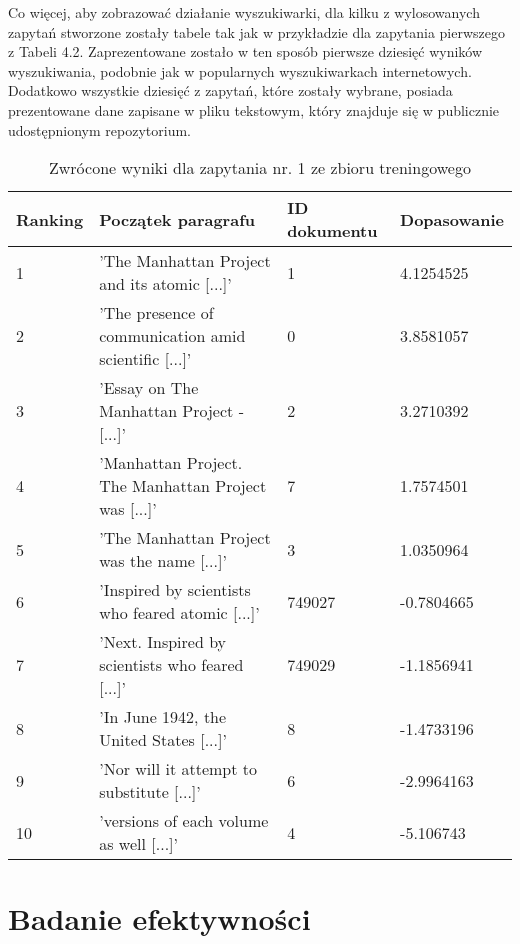 Co więcej, aby zobrazować działanie wyszukiwarki, dla kilku z wylosowanych zapytań stworzone zostały tabele tak jak w przykładzie dla zapytania pierwszego z Tabeli 4.2. Zaprezentowane zostało w ten sposób pierwsze dziesięć wyników wyszukiwania, podobnie jak w popularnych wyszukiwarkach internetowych. Dodatkowo wszystkie dziesięć z zapytań, które zostały wybrane, posiada prezentowane dane zapisane w pliku tekstowym, który znajduje się w publicznie udostępnionym repozytorium. 

\begin{table}[htp]
\centering
\caption{Zwrócone wyniki dla zapytania nr. 1 ze zbioru treningowego\protect\footnotemark[1]}
\vspace*{5mm}
\begin{tabular}{llll}
   Ranking & Początek paragrafu & ID dokumentu & Dopasowanie \\
   \hline
    1 & 'The Manhattan Project and its atomic [...]' & 1 & 4.1254525 \\
    2 & 'The presence of communication amid scientific [...]' & 0 &  3.8581057\\
    3 & 'Essay on The Manhattan Project - [...]' & 2 & 3.2710392 \\
    4 & 'Manhattan Project. The Manhattan Project was [...]' & 7 & 1.7574501 \\
    5 & 'The Manhattan Project was the name [...]' & 3 & 1.0350964 \\
    6 & 'Inspired by scientists who feared atomic [...]' & 749027 &  -0.7804665 \\
    7 & 'Next. Inspired by scientists who feared  [...]' & 749029 & -1.1856941 \\
    8 & 'In June 1942, the United States [...]' & 8 & -1.4733196 \\
    9 & 'Nor will it attempt to substitute [...]' & 6 & -2.9964163 \\
    10 & 'versions of each volume as well [...]' & 4 & -5.106743 \\

\end{tabular}
\end{table}


\section{Badanie efektywności}

